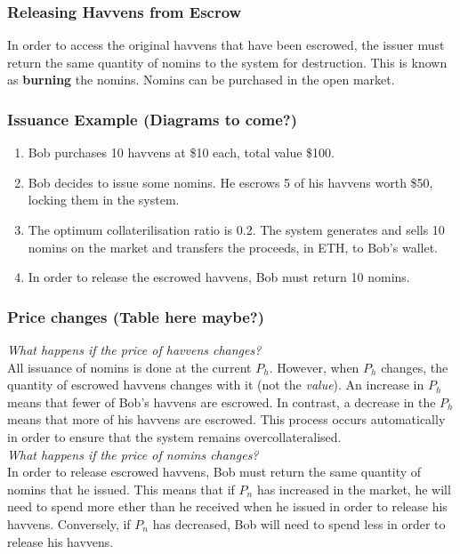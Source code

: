 \subsubsection{Releasing Havvens from Escrow}

\noindent In order to access the original havvens that have been escrowed, the issuer must return the same quantity of nomins to the system for destruction. This is known as \textbf{burning} the nomins. Nomins can be purchased in the open market.

\subsubsection{Issuance Example (Diagrams to come?)}

\begin{enumerate}
\item{Bob purchases 10 havvens at \$10 each, total value \$100.}
\item{Bob decides to issue some nomins. He escrows 5 of his havvens worth \$50, locking them in the system.}
\item{The optimum collaterilisation ratio is 0.2. The system generates and sells 10 nomins on the market and transfers the proceeds, in ETH, to Bob's wallet.}
\item{In order to release the escrowed havvens, Bob must return 10 nomins.}
\end{enumerate}

\subsubsection{Price changes (Table here maybe?)}

\noindent \emph{What happens if the price of havvens changes?} \\

\noindent All issuance of nomins is done at the current $P_h$. However, when $P_h$ changes, the quantity of escrowed havvens changes with it (not the \emph{value}). An increase in $P_h$ means that fewer of Bob's havvens are escrowed. In contrast, a decrease in the $P_h$ means that more of his havvens are escrowed. This process occurs automatically in order to ensure that the system remains overcollateralised. \\ 

\noindent \emph{What happens if the price of nomins changes?} \\ 

\noindent In order to release escrowed havvens, Bob must return the same quantity of nomins that he issued. This means that if $P_n$ has increased in the market, he will need to spend more ether than he received when he issued in order to release his havvens. Conversely, if $P_n$ has decreased, Bob will need to spend less in order to release his havvens.


